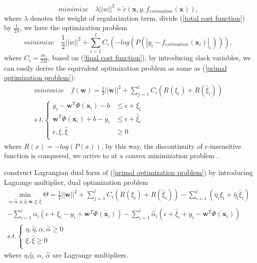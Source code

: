 \documentclass[12pt, draftclsnofoot, onecolumn]{IEEEtran}
\begin{document}
\begin{equation}
minimize\quad \lambda||w||^{2}+\tilde{c}(\mathbf{x}, y, f_{estimation}(\mathbf{x})),
\label{total cost function}
\end{equation} 
where $\lambda$ denotes the weight of regularization term, divide (\ref{total cost function}) by $\frac{1}{2\lambda}$, we have the optimization problem  
\begin{equation}
minimize \quad \frac{1}{2}||w||^{2}+\sum_{i=1}^{l}C_{i}(-log(P(|y_{i}-f_{estimation}(\mathbf{x}_{i})|_{\epsilon}))),
\label{final cost function}
\end{equation}
where $C_{i}=\frac{m_{i}}{2\lambda l}$, based on (\ref{final cost function}), by introducing slack variables, we can easily derive the equivalent optimization problem as same as (\ref{primal optimization problem}):
\begin{eqnarray}
\nonumber
minimize \quad f(\mathbf{w})=\frac{1}{2}||\mathbf{w}||^{2}+\sum_{j=1}^{l}C_{i}(R(\xi_{i})+R(\hat{\xi}_{i}))\\
s.t. \left\{\begin{array}{ll}
y_{i}-\mathbf{w}^{T}\Phi(\mathbf{x}_{i})-b &\leq \epsilon+\xi_{i}\\
\mathbf{w}^{T}\Phi(\mathbf{x}_{i})+b-y_{i} &\leq \epsilon+\hat{\xi}_{i}\\
\epsilon, \xi,\hat{\xi} &\geq 0\\
\end{array}\right.
\label{primal objective function}
\end{eqnarray}
where $R(x)=-log(P(x))$, by this way, the discontinuity of $\epsilon$-insensitive function is conquered, we arrive to at a convex minimization problem \cite{smola and skpkof 1998a tutorial of SVR}. 

construct Lagrangian dual form of (\ref{primal optimization problem}) by introducing Lagrange multiplier,  dual optimization problem
\begin{eqnarray}
\nonumber
\min_{\alpha, \hat{\alpha}, \eta, \hat{\eta}, \mathbf{w}, \xi, \hat{\xi}}\Theta=
\frac{1}{2}||\mathbf{w}||^{2}+\sum_{j=1}^{l}C_{i}(R(\xi_{i})+R(\hat{\xi}_{i}))-\sum_{i=1}^{l}(\eta_{i}\xi_{i}+\hat{\eta}_{i}\hat{\xi}_{i})\\
\nonumber
-\sum_{i=1}^{l}\alpha_{i}(\epsilon+\xi_{i}-y_{i}+\mathbf{w}^{T}\Phi(\mathbf{x}_{i}))-\sum_{i=1}^{l}\hat{\alpha}_{i}(\epsilon+\hat{\xi}_{i}+y_{i}-\mathbf{w}^{T}\Phi(\mathbf{x}_{i}))\\
s.t. \left\{\begin{array}{cc}
\eta, \hat{\eta}, \alpha, \hat{\alpha}\geq 0\\
\xi, \hat{\xi}\geq  0\\
\end{array}\right. 
\label{lagrange duality1}
\end{eqnarray}
where $\eta$,$\hat{\eta}$, $\alpha$, $\hat{\alpha}$ are Lagrange multipliers.
\end{document}

